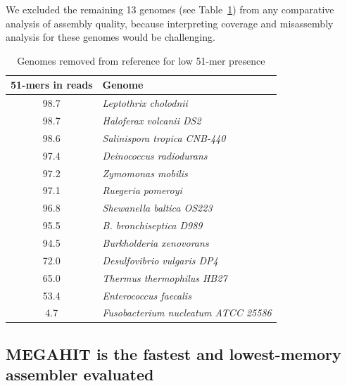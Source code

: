 \documentclass[11pt]{article}
\begin{document}
We excluded the remaining 13 genomes (see
Table~\ref{table:51mer_remove}) from any comparative analysis of
assembly quality, because interpreting coverage and misassembly
analysis for these genomes would be challenging.

\begin{table}[t]
\caption{Genomes removed from reference for low 51-mer presence}
\centering
\begin{tabular}{|c|l|}
\hline

\textbf{51-mers in reads}& \textbf{Genome} \\ [0.5ex] %
\hline
98.7 & { \small \em Leptothrix cholodnii } \\ \hline
98.7 & { \small \em Haloferax volcanii DS2 } \\ \hline
98.6 & { \small \em Salinispora tropica CNB-440 } \\ \hline
97.4 & { \small \em Deinococcus radiodurans } \\ \hline
97.2 & { \small \em Zymomonas mobilis } \\ \hline
97.1 & { \small \em Ruegeria pomeroyi } \\ \hline
96.8 & { \small \em Shewanella baltica OS223 } \\ \hline
95.5 & { \small \em B. bronchiseptica D989 } \\ \hline
94.5 & { \small \em Burkholderia xenovorans } \\ \hline
72.0 & { \small \em Desulfovibrio vulgaris DP4 } \\ \hline
65.0 & { \small \em Thermus thermophilus HB27 } \\ \hline
53.4 & { \small \em Enterococcus faecalis } \\ \hline
4.7 & { \small \em Fusobacterium nucleatum ATCC 25586 } \\ \hline
\end{tabular}
\label{table:51mer_remove}
\end{table}



\subsection*{MEGAHIT is the fastest and lowest-memory assembler evaluated}
\end{document}
